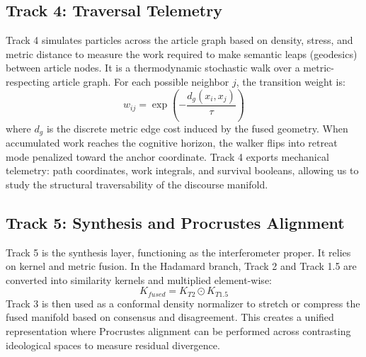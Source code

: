 \subsection{Track 4: Traversal Telemetry}

Track 4 simulates particles across the article graph based on density, stress, and metric distance to measure the work required to make semantic leaps (geodesics) between article nodes. It is a thermodynamic stochastic walk over a metric-respecting article graph. For each possible neighbor $j$, the transition weight is:
\begin{equation}
w_{ij} = \exp\left(-\frac{d_g(x_i,x_j)}{\tau}\right)
\end{equation}
where $d_g$ is the discrete metric edge cost induced by the fused geometry. When accumulated work reaches the cognitive horizon, the walker flips into retreat mode penalized toward the anchor coordinate. Track 4 exports mechanical telemetry: path coordinates, work integrals, and survival booleans, allowing us to study the structural traversability of the discourse manifold.

\subsection{Track 5: Synthesis and Procrustes Alignment}

Track 5 is the synthesis layer, functioning as the interferometer proper. It relies on kernel and metric fusion. In the Hadamard branch, Track 2 and Track 1.5 are converted into similarity kernels and multiplied element-wise:
\begin{equation}
K_{fused} = K_{T2} \odot K_{T1.5}
\end{equation}
Track 3 is then used as a conformal density normalizer to stretch or compress the fused manifold based on consensus and disagreement. This creates a unified representation where Procrustes alignment can be performed across contrasting ideological spaces to measure residual divergence.
